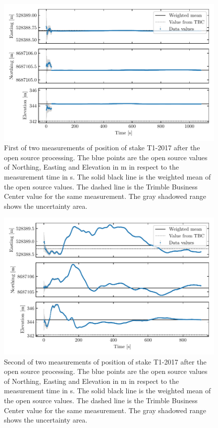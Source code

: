 \begin{figure}[h]
    \centering
    \includegraphics[width=.9\textwidth]{./figs/timeseries/46250700_corr-T1-i-2017_Timeseries-east-north-elev.pdf}
    \caption{First of two measurements of position of stake T1-2017 after the open source processing. The blue points are the open source values of Northing, Easting and Elevation in m in respect to the measurement time in s. The solid black line is the weighted mean of the open source values. The dashed line is the Trimble Business Center value for the same measurement. The gray shadowed range shows the uncertainty area.}
    \label{GPS:fig:T1-i_timeseries}
\end{figure}

\begin{figure}[h]
    \centering
    \includegraphics[width=.9\textwidth]{./figs/timeseries/46250723_corr-T1-ii-2017_Timeseries-east-north-elev.pdf}
    \caption{Second of two measurements of position of stake T1-2017  after the open source processing. The blue points are the open source values of Northing, Easting and Elevation in m in respect to the measurement time in s. The solid black line is the weighted mean of the open source values. The dashed line is the Trimble Business Center value for the same measurement. The gray shadowed range shows the uncertainty area.}
    \label{GPS:fig:T1-ii_timeseries}
\end{figure}

